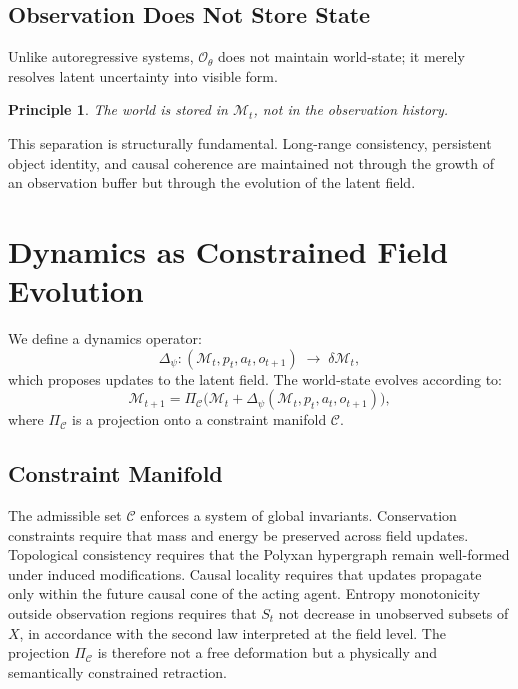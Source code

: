 \documentclass[11pt]{article}
\newtheorem{principle}{Principle}
\begin{document}
\subsection{Observation Does Not Store State}

Unlike autoregressive systems, $\mathcal{O}_\theta$ does not maintain
world-state; it merely resolves latent uncertainty into visible form.

\begin{principle}
The world is stored in $\mathcal{M}_t$, not in the observation history.
\end{principle}

This separation is structurally fundamental.
Long-range consistency, persistent object identity, and causal coherence
are maintained not through the growth of an observation buffer but through
the evolution of the latent field.

\section{Dynamics as Constrained Field Evolution}

We define a dynamics operator:
\[
\Delta_\psi :
(\mathcal{M}_t, p_t, a_t, o_{t+1})
\;\longrightarrow\;
\delta \mathcal{M}_t,
\]
which proposes updates to the latent field.
The world-state evolves according to:
\[
\mathcal{M}_{t+1}
=
\Pi_{\mathcal{C}}
\big(
\mathcal{M}_t + \Delta_\psi(\mathcal{M}_t,p_t,a_t,o_{t+1})
\big),
\]
where $\Pi_{\mathcal{C}}$ is a projection onto a constraint manifold
$\mathcal{C}$.

\subsection{Constraint Manifold}

The admissible set $\mathcal{C}$ enforces a system of global invariants.
Conservation constraints require that mass and energy be preserved across
field updates.
Topological consistency requires that the Polyxan hypergraph remain
well-formed under induced modifications.
Causal locality requires that updates propagate only within the future
causal cone of the acting agent.
Entropy monotonicity outside observation regions requires that $S_t$
not decrease in unobserved subsets of $X$, in accordance with the second
law interpreted at the field level.
The projection $\Pi_{\mathcal{C}}$ is therefore not a free deformation
but a physically and semantically constrained retraction.
\end{document}
